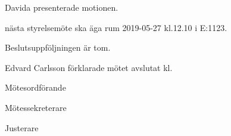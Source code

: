 \documentclass[10pt]{article}
\def\mo{Edvard Carlsson}
\def\ms{Mattias Lundström}
\def\ji{-----}
\begin{document}
\begin{paragrafer}
\begin{paragrafer}






\end{paragrafer}

Davida presenterade motionen.

\Mbaby 


\Mba nästa styrelsemöte ska äga rum 2019-05-27 kl.12.10 i E:1123.

Beslutsuppföljningen är tom.


{\mo} förklarade mötet avslutat kl. 
\end{paragrafer}

\hidesignfoot
\begin{signatures}{3}
\signature{\mo}{Mötesordförande}
\signature{\ms}{Mötessekreterare}
\signature{\ji}{Justerare}
\end{signatures}
\end{document}
